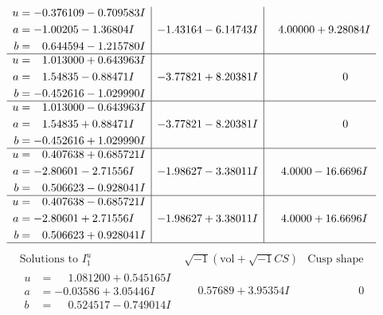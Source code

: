 \documentclass[1p]{elsarticle_modified}
\theoremstyle{definition}
\newcommand{\I}{\sqrt{-1}}
\begin{document}
$$\begin{array}{c|c|c}
\begin{aligned}
u &= -0.376109 - 0.709583 I \\
a &= -1.00205 - 1.36804 I \\
b &= \phantom{-}0.644594 - 1.215780 I\end{aligned}
 & -1.43164 - 6.14743 I & \phantom{-}4.00000 + 9.28084 I \\ \hline\begin{aligned}
u &= \phantom{-}1.013000 + 0.643963 I \\
a &= \phantom{-}1.54835 - 0.88471 I \\
b &= -0.452616 - 1.029990 I\end{aligned}
 & -3.77821 + 8.20381 I & \phantom{-0.000000 } 0 \\ \hline\begin{aligned}
u &= \phantom{-}1.013000 - 0.643963 I \\
a &= \phantom{-}1.54835 + 0.88471 I \\
b &= -0.452616 + 1.029990 I\end{aligned}
 & -3.77821 - 8.20381 I & \phantom{-0.000000 } 0 \\ \hline\begin{aligned}
u &= \phantom{-}0.407638 + 0.685721 I \\
a &= -2.80601 - 2.71556 I \\
b &= \phantom{-}0.506623 - 0.928041 I\end{aligned}
 & -1.98627 - 3.38011 I & \phantom{-}4.0000 - 16.6696 I \\ \hline\begin{aligned}
u &= \phantom{-}0.407638 - 0.685721 I \\
a &= -2.80601 + 2.71556 I \\
b &= \phantom{-}0.506623 + 0.928041 I\end{aligned}
 & -1.98627 + 3.38011 I & \phantom{-}4.0000 + 16.6696 I\\
 \hline 
 \end{array}$$\newpage$$\begin{array}{c|c|c}  
\text{Solutions to }I^u_{1}& \I (\text{vol} + \sqrt{-1}CS) & \text{Cusp shape}\\
 \hline 
\begin{aligned}
u &= \phantom{-}1.081200 + 0.545165 I \\
a &= -0.03586 + 3.05446 I \\
b &= \phantom{-}0.524517 - 0.749014 I\end{aligned}
 & \phantom{-}0.57689 + 3.95354 I & \phantom{-0.000000 } 0 \\ \hline\begin{aligned}

\end{aligned}
\end{array}$$
\end{document}
